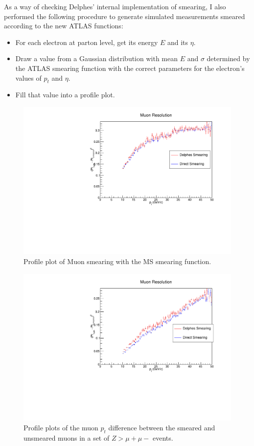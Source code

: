 \documentclass[10pt]{ucscthesisbs}
\begin{document}
As a way of checking Delphes' internal implementation of smearing, I also performed the following procedure to generate simulated measurements smeared according to the new ATLAS functions:
\begin{itemize}
\item For each electron at parton level, get its energy $E$ and its $\eta$. 
\item Draw a value from a Gaussian distribution with mean $E$ and $\sigma$ determined by the ATLAS smearing function with the correct parameters for the electron's values of $p_t$ and $\eta$. 
\item Fill that value into a profile plot.
\end{itemize}

\begin{figure}
\includegraphics[height=8cm]{images/MSSmearing}
\caption{Profile plot of Muon smearing with the MS smearing function.}
\label{fig:SigmaMS}
\end{figure}
\begin{figure} 
\includegraphics[height=8cm]{images/IDSmearing}
\caption{Profile plots of the muon $p_t$ difference between the smeared and unsmeared muons in a set of $Z > \mu+ \mu-$ events.}
\label{fig:SigmaID}
\end{figure}
\end{document}
